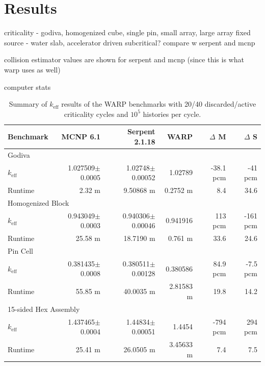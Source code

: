\chapter{Results}
\label{chap:results}


criticality - godiva, homogenized cube, single pin,  small array, large array
fixed source - water slab, accelerator driven subcritical?
compare w serpent and mcnp

collision estimator values are shown for serpent and mcnp (since this is what warp uses as well)

computer stats

\begin{table}[h]
\centering
\caption{Summary of $k_\mathrm{eff}$ results of the WARP benchmarks with 20/40 discarded/active criticality cycles and $10^5$ histories per cycle.}
\label{benchmark_summary}
\begin{tabular}{| l | r | r | r | r | r |}
 \hline
 Benchmark & MCNP 6.1 & Serpent 2.1.18 & WARP & $\Delta$ M & $\Delta$ S  \\
\hline
\hline
\multicolumn{6}{|l|}{Godiva}  \\
\hline
 $k_\mathrm{eff}$ & 1.027509$\pm$0.0005 & 1.02748$\pm$0.00052 & 1.02789 & -38.1 pcm & -41 pcm  \\
 \hline
 Runtime               & 2.32 m & 9.50868 m & 0.2752 m & 8.4  & 34.6  \\
 \hline
 \hline
\multicolumn{6}{|l|}{Homogenized Block }\\
\hline
 $k_\mathrm{eff}$ & 0.943049$\pm$0.0003 & 0.940306$\pm$0.00046 & 0.941916 & 113 pcm & -161 pcm   \\
 \hline
 Runtime               &  25.58 m & 18.7190 m & 0.761 m & 33.6  & 24.6  \\
 \hline
  \hline
\multicolumn{6}{|l|}{Pin Cell}\\
\hline
 $k_\mathrm{eff}$ & 0.381435$\pm$0.0008 &  0.380511$\pm$0.00128 & 0.380586 & 84.9 pcm &  -7.5 pcm    \\
 \hline
 Runtime               & 55.85 m & 40.0035 m &  2.81583 m &  19.8 & 14.2  \\
 \hline
  \hline
\multicolumn{6}{|l|}{15-sided Hex Assembly}\\
\hline
 $k_\mathrm{eff}$ & 1.437465$\pm$0.0004 & 1.44834$\pm$0.00051 & 1.4454 & -794 pcm & 294 pcm  \\
 \hline
 Runtime               & 25.41 m &  26.0505 m &  3.45633 m  & 7.4 & 7.5  \\
 \hline
\end{tabular}
\end{table}


